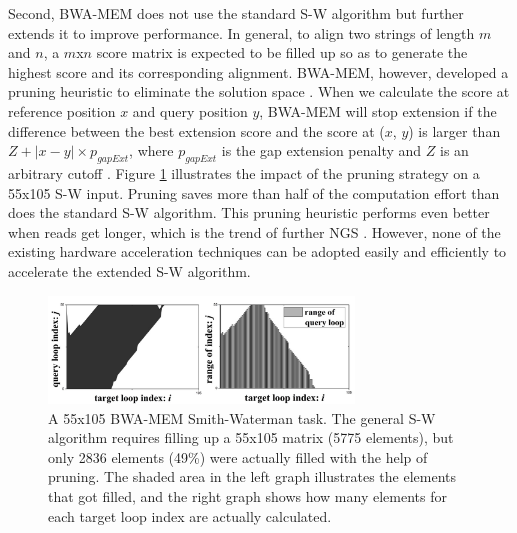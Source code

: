 Second, BWA-MEM does not use the standard S-W algorithm but further extends it to improve performance. 
In general, to align two strings of length $m$ and $n$, 
a $m$x$n$ score matrix is expected to be filled up so as to generate the highest score and its corresponding alignment. 
BWA-MEM, however, developed a pruning heuristic to eliminate the solution space \cite{BWA-MEM}.
When we calculate the score at reference position $x$ and query position $y$, BWA-MEM will stop extension 
if the difference between the best extension score and the score at ($x$, $y$) is larger than $Z+\lvert x-y \rvert \times p_{gapExt}$, 
where $p_{gapExt}$ is the gap extension penalty and $Z$ is an arbitrary cutoff \cite{BWA-MEM}.
Figure \ref{fig:F2C2} illustrates the impact of the pruning strategy on a 55x105 S-W input. 
Pruning saves more than half of the computation effort than does the standard S-W algorithm. 
This pruning heuristic performs even better when reads get longer, which is the trend of further NGS \cite{Mardis2008}\cite{Heng2010}\cite{BWA-MEM}.
However, none of the existing hardware acceleration techniques can be adopted easily and efficiently to accelerate the extended S-W algorithm. 

\begin{figure}[!hbt]
	\begin{center}
		\includegraphics[width=3.2in]{Figures/Figure2C2.jpg}
		\caption {A 55x105 BWA-MEM Smith-Waterman task. The general S-W algorithm requires filling up a 55x105 matrix (5775 elements), but only 2836 elements (49\%) were actually filled with the help of pruning. The shaded area in the left graph illustrates the elements that got filled, and the right graph shows how many elements for each target loop index are actually calculated.}
		\label{fig:F2C2}
	\end{center}
\end{figure}

